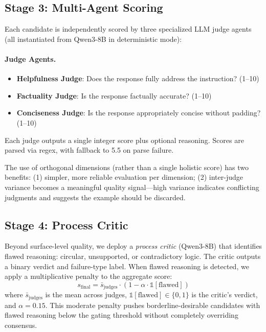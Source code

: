 \documentclass{article}
\begin{document}
\subsection{Stage 3: Multi-Agent Scoring}
\label{sec:stage3}

Each candidate is independently scored by three specialized LLM judge agents (all instantiated from Qwen3-8B in deterministic mode):

\paragraph{Judge Agents.}
\begin{itemize}[leftmargin=*,itemsep=0.5ex]
  \item \textbf{Helpfulness Judge}: Does the response fully address the instruction? (1--10)
  \item \textbf{Factuality Judge}: Is the response factually accurate? (1--10)
  \item \textbf{Conciseness Judge}: Is the response appropriately concise without padding? (1--10)
\end{itemize}
Each judge outputs a single integer score plus optional reasoning.
Scores are parsed via regex, with fallback to 5.5 on parse failure.

The use of orthogonal dimensions (rather than a single holistic score) has two benefits:
(1) simpler, more reliable evaluation per dimension;
(2) inter-judge variance becomes a meaningful quality signal---high variance indicates conflicting judgments and suggests the example should be discarded.

\subsection{Stage 4: Process Critic}
\label{sec:stage4}

Beyond surface-level quality, we deploy a \emph{process critic} (Qwen3-8B) that identifies flawed reasoning: circular, unsupported, or contradictory logic.
The critic outputs a binary verdict and failure-type label.
When flawed reasoning is detected, we apply a multiplicative penalty to the aggregate score:
\begin{equation}
  s_{\text{final}} = \bar{s}_{\text{judges}} \cdot (1 - \alpha \cdot \mathbb{1}[\text{flawed}])
  \label{eq:penalty}
\end{equation}
where $\bar{s}_{\text{judges}}$ is the mean across judges, $\mathbb{1}[\text{flawed}] \in \{0,1\}$ is the critic's verdict, and $\alpha{=}0.15$.
This moderate penalty pushes borderline-desirable candidates with flawed reasoning below the gating threshold without completely overriding consensus.
\end{document}
